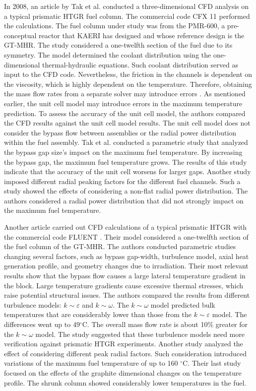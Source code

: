 In 2008, an article by Tak et al. \cite{tak_numerical_2008} conducted  a three-dimensional \gls{CFD} analysis on a typical prismatic \gls{HTGR} fuel column.
The commercial code CFX 11 \cite{ansys_incorporated_cfx_2006} performed the calculations.
The fuel column under study was from the PMR-600, a pre-conceptual reactor that \gls{KAERI} has designed and whose reference design is the GT-MHR.
The study considered a one-twelfth section of the fuel due to its symmetry.
The model determined the coolant distribution using the one-dimensional thermal-hydraulic equations.
Such coolant distribution served as input to the CFD code.
Nevertheless, the friction in the channels is dependent on the viscosity, which is highly dependent on the temperature.
Therefore, obtaining the mass flow rates from a separate solver may introduce errors \cite{sato_computational_2010}.
As mentioned earlier, the unit cell model may introduce errors in the maximum temperature prediction.
To assess the accuracy of the unit cell model, the authors compared the CFD results against the unit cell model results.
The unit cell model does not consider the bypass flow between assemblies or the radial power distribution within the fuel assembly.
Tak et al. conducted a parametric study that analyzed the bypass gap size's impact on the maximum fuel temperature.
By increasing the bypass gap, the maximum fuel temperature grows.
The results of this study indicate that the accuracy of the unit cell worsens for larger gaps.
Another study imposed different radial peaking factors for the different fuel channels.
Such a study showed the effects of considering a non-flat radial power distribution.
The authors considered a radial power distribution that did not strongly impact on the maximum fuel temperature.

Another article \cite{sato_computational_2010} carried out \gls{CFD} calculations of a typical prismatic \gls{HTGR} with the commercial code FLUENT \cite{fluent_inc_fluent_2006}.
Their model considered a one-twelfth section of the fuel column of the GT-MHR.
The authors conducted parametric studies changing several factors, such as bypass gap-width, turbulence model, axial heat generation profile, and geometry changes due to irradiation.
Their most relevant results show that the bypass flow causes a large lateral temperature gradient in the block.
Large temperature gradients cause excessive thermal stresses, which raise potential structural issues.
The authors compared the results from different turbulence models: $k \sim \varepsilon$ and $k \sim \omega$.
The $k \sim \omega$ model predicted bulk temperatures that are considerably lower than those from the $k \sim \varepsilon$ model.
The differences went up to 49$^{\circ}$C.
The overall mass flow rate is about 10$\%$ greater for the $k \sim \omega$ model.
The study suggested that these turbulence models need more verification against prismatic \gls{HTGR} experiments.
Another study analyzed the effect of considering different peak radial factors.
Such consideration introduced variations of the maximum fuel temperature of up to 160 $^{\circ}$C.
Their last study focused on the effects of the graphite dimensional changes on the temperature profile.
The shrunk column showed considerably lower temperatures in the fuel.

